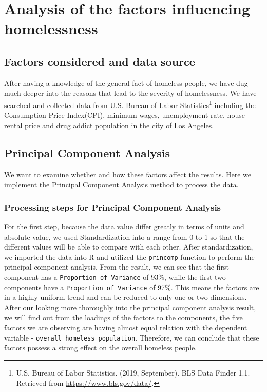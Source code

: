 \documentclass[]{article}
\let\rmarkdownfootnote\footnote%
\def\footnote{\protect\rmarkdownfootnote}
\begin{document}
\hypertarget{analysis-of-the-factors-influencing-homelessness}{%
\section{Analysis of the factors influencing
homelessness}\label{analysis-of-the-factors-influencing-homelessness}}

\hypertarget{factors-considered-and-data-source}{%
\subsection{Factors considered and data
source}\label{factors-considered-and-data-source}}

After having a knowledge of the general fact of homeless people, we have
dug much deeper into the reasons that lead to the severity of
homelessness. We have searched and collected data from U.S. Bureau of
Labor Statistics\footnote{U.S. Bureau of Labor Statistics. (2019,
  September). BLS Data Finder 1.1. Retrieved from
  \url{https://www.bls.gov/data/}.} including the Consumption Price
Index(CPI), minimum wages, unemployment rate, house rental price and
drug addict population in the city of Los Angeles.

\hypertarget{principal-component-analysis}{%
\subsection{Principal Component
Analysis}\label{principal-component-analysis}}

We want to examine whether and how these factors affect the results.
Here we implement the Principal Component Analysis method to process the
data.

\hypertarget{processing-steps-for-principal-component-analysis}{%
\subsubsection{Processing steps for Principal Component
Analysis}\label{processing-steps-for-principal-component-analysis}}

For the first step, because the data value differ greatly in terms of
units and absolute value, we used Standardization into a range from 0 to
1 so that the different values will be able to compare with each other.
After standardization, we imported the data into R and utilized the
\texttt{princomp} function to perform the principal component analysis.
From the result, we can see that the first component has a
\texttt{Proportion\ of\ Variance} of 93\%, while the first two
components have a \texttt{Proportion\ of\ Variance} of 97\%. This means
the factors are in a highly uniform trend and can be reduced to only one
or two dimensions. After our looking more thoroughly into the principal
component analysis result, we will find out from the loadings of the
factors to the components, the five factors we are observing are having
almost equal relation with the dependent variable -
\texttt{overall\ homeless\ population}. Therefore, we can conclude that
these factors possess a strong effect on the overall homeless people.
\end{document}
